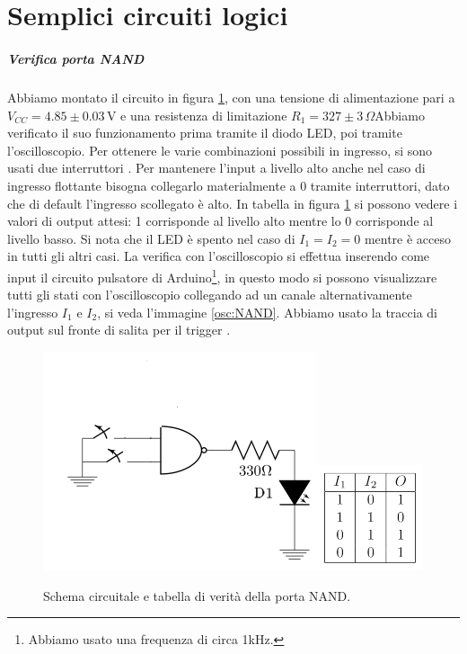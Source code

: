 \documentclass[10pt,a4paper]{article}
\begin{document}
\section{Semplici circuiti logici}
\subparagraph{Verifica porta NAND}
Abbiamo montato il circuito in figura \ref{fig:NAND}, con una tensione di alimentazione pari a $V_{CC}= 4.85\pm0.03\,\text{V}$ e una resistenza di limitazione $R_1=327\pm3\,\Omega$Abbiamo verificato il suo funzionamento prima tramite il diodo LED, poi tramite l'oscilloscopio. Per ottenere le varie combinazioni possibili in ingresso, si sono usati due interruttori . Per mantenere l'input a livello alto anche nel caso di ingresso flottante bisogna collegarlo materialmente a 0 tramite interruttori, dato che di default l'ingresso scollegato è alto. In tabella in figura \ref{fig:NAND} si possono vedere i valori di output attesi: 1 corrisponde al livello alto mentre lo 0 corrisponde al livello basso. Si nota che il LED è spento nel caso di $I_1=I_2=0$ mentre è acceso in tutti gli altri casi. La verifica con l'oscilloscopio si effettua inserendo come input il circuito pulsatore di Arduino\footnote{Abbiamo usato una frequenza di circa 1kHz.}, in questo modo si possono visualizzare tutti gli stati con l'oscilloscopio collegando ad un canale alternativamente l'ingresso $I_1$ e $I_2$, si veda l'immagine \ref{osc:NAND}. Abbiamo usato la traccia di output sul fronte di salita per il trigger .\\


\begin{figure}[!htb]
  \centering
  \includegraphics[scale=0.8]{nand.png}\includegraphics[scale=0.9]{tabNAND.png}
\caption{Schema circuitale e tabella di verità della porta NAND.\label{fig:NAND}}
\end{figure}
\end{document}
